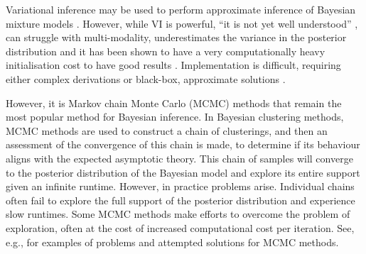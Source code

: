 \documentclass[12pt]{article}
\begin{document}


Variational inference \citep[\textbf{VI},][]{blei2006variational} may be used to perform approximate inference of Bayesian mixture models \citep{martin2020computing}. However,
while VI is powerful, ``it is not yet well understood'' \citep{blei2017variational}, can struggle with multi-modality, underestimates the variance in the posterior distribution \citep{two2011turner} and it has been shown to have a very computationally heavy initialisation cost to have good results \citep{wang2011fast}. Implementation is difficult, requiring either complex derivations \citep[see the Appendix Supplementary Methods of][for an example]{argelaguet2018multi} or black-box, approximate solutions \citep{kucukelbir2017automatic}.

However, it is Markov chain Monte Carlo (MCMC) methods that remain the most popular method for Bayesian inference. In Bayesian clustering methods, MCMC methods are used to construct a chain of clusterings, and then an assessment of the convergence of this chain is made, to determine if its behaviour aligns with the expected asymptotic theory. This chain of samples will converge to the posterior distribution of the Bayesian model and explore its entire support given an infinite runtime. However, in practice problems arise. Individual chains often fail to explore the full support of the posterior distribution \citep[an example of different chains becoming trapped in a single mode of the likelihood surface can be seen in the Supplementary Materials of ][]{strauss2020gpseudoclust} and experience slow runtimes. Some MCMC methods make efforts to overcome the problem of exploration, often at the cost of increased computational cost per iteration. See, e.g., \cite{robert2018accelerating, yao2020stacking} for examples of problems and attempted solutions for MCMC methods.
\end{document}
